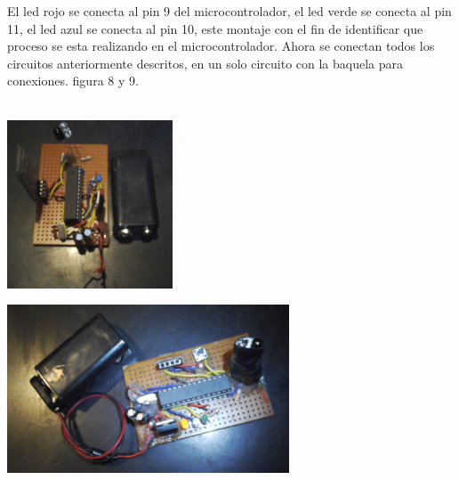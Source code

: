 \documentclass[12pt]{article}
\newenvironment{Figure}
{\par\medskip\noindent\minipage{\linewidth}}
{\endminipage\par\medskip}
\begin{document}
\begin{multicols}{2}
El led rojo se conecta al pin  9 del microcontrolador, el led verde se conecta al pin 11, el led azul se conecta al pin 10, este montaje con el fin de identificar que proceso se esta realizando en el microcontrolador. Ahora se conectan todos los circuitos anteriormente descritos, en un solo circuito con la baquela para conexiones. figura 8 y 9.  
\\ \\
\begin{Figure}
\center
\includegraphics[width=7.cm, height=5cm]{fig/mon0.png}
\label{fig:8}
\end{Figure}
\vspace{0.2cm}

\begin{Figure}
\center
\includegraphics[width=7.cm, height=5cm]{fig/mon1.png}
\label{fig:9}
\end{Figure}
\vspace{0.2cm}


\end{multicols}
\end{document}
